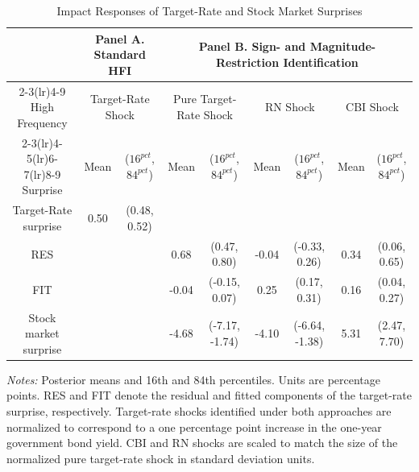 \begin{table}[t]
\hypertarget{Panel AT3}{}
\hypertarget{Panel BT3}{}
\hypertarget{Table 3}{}
\begin{center}
\resizebox{16cm}{!} {
\begin{tabular}{c c c c c c c c c}
\toprule
& \multicolumn{2}{c}{Panel A. Standard HFI}
& \multicolumn{6}{c}{Panel B. Sign- and Magnitude-Restriction Identification} \\
\cmidrule(lr){2-3}\cmidrule(lr){4-9}
High Frequency
& \multicolumn{2}{c}{Target-Rate Shock}
& \multicolumn{2}{c}{Pure Target-Rate Shock}
& \multicolumn{2}{c}{RN Shock}
& \multicolumn{2}{c}{CBI Shock} \\
\cmidrule(lr){2-3}\cmidrule(lr){4-5}\cmidrule(lr){6-7}\cmidrule(lr){8-9}
Surprise
& Mean & ($16^{pct}$, $84^{pct}$)
& Mean & ($16^{pct}$, $84^{pct}$)
& Mean & ($16^{pct}$, $84^{pct}$)
& Mean & ($16^{pct}$, $84^{pct}$) \\
\midrule
Target-Rate surprise
& 0.50 & (0.48, 0.52)
&  & 
&   & 
&   &  \\
RES
&  & 
& 0.68 & (0.47, 0.80)
& -0.04 & (-0.33, 0.26)
& 0.34 & (0.06, 0.65) \\
FIT
&   & 
& -0.04 & (-0.15, 0.07)
& 0.25 & (0.17, 0.31)
& 0.16 & (0.04, 0.27) \\
Stock market surprise
&   & 
& -4.68 & (-7.17, -1.74)
& -4.10 & (-6.64, -1.38)
& 5.31 & (2.47, 7.70) \\
\bottomrule
\end{tabular}}
\caption{Impact Responses of Target-Rate and Stock Market Surprises}
\end{center}
\begin{footnotesize}
\textit{Notes:} Posterior means and 16th and 84th percentiles. Units are percentage points. RES and FIT denote the residual and fitted components of the target-rate surprise, respectively. Target-rate shocks identified under both approaches are normalized to correspond to a one percentage point increase in the one-year government bond yield. CBI and RN shocks are scaled to match the size of the normalized pure target-rate shock in standard deviation units.
\end{footnotesize}
\end{table}

